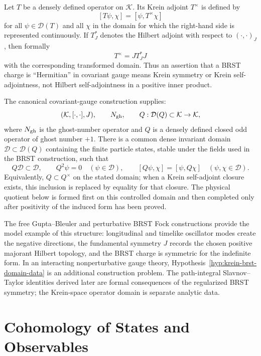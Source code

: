 Let \(T\) be a densely defined operator on \(\mathcal K\).  Its Krein adjoint
\(T^\times\) is defined by
\[
  [T\psi,\chi]=[\psi,T^\times\chi]
\]
for all \(\psi\in\mathcal D(T)\) and all \(\chi\) in the domain for which the
right-hand side is represented continuously.  If \(T_J^*\) denotes the Hilbert
adjoint with respect to \((\cdot,\cdot)_J\), then formally
\[
  T^\times=J T_J^* J
\]
with the corresponding transformed domain.  Thus an assertion that a BRST
charge is ``Hermitian'' in covariant gauge means Krein symmetry or
Krein self-adjointness, not Hilbert self-adjointness in a positive inner
product.

\begin{hypothesis}
\label{hyp:krein-brst-domain-data}
The canonical covariant-gauge construction supplies:
\[
  (\mathcal K,[\cdot,\cdot],J),\qquad
  N_{\rm gh},\qquad
  Q:\mathcal D(Q)\subset\mathcal K\to\mathcal K ,
\]
where \(N_{\rm gh}\) is the ghost-number operator and \(Q\) is a densely
defined closed odd operator of ghost number \(+1\).  There is a common dense
invariant domain \(\mathcal D\subset\mathcal D(Q)\) containing the finite
particle states, stable under the fields used in the BRST construction, such
that
\[
  Q\mathcal D\subset\mathcal D,\qquad
  Q^2\psi=0\quad(\psi\in\mathcal D),\qquad
  [Q\psi,\chi]=[\psi,Q\chi]\quad(\psi,\chi\in\mathcal D).
\]
Equivalently, \(Q\subset Q^\times\) on the stated domain; when a Krein
self-adjoint closure exists, this inclusion is replaced by equality for that
closure.  The physical quotient below is formed first on this controlled
domain and then completed only after positivity of the induced form has been
proved.
\end{hypothesis}

The free Gupta--Bleuler and perturbative BRST Fock constructions provide the
model example of this structure: longitudinal and timelike oscillator modes
create the negative directions, the fundamental symmetry \(J\) records the
chosen positive majorant Hilbert topology, and the BRST charge is symmetric
for the indefinite form.  In an interacting nonperturbative gauge theory,
Hypothesis~\ref{hyp:krein-brst-domain-data} is an additional construction
problem.  The path-integral Slavnov--Taylor identities derived later are
formal consequences of the regularized BRST symmetry; the Krein-space
operator domain is separate analytic data.

\section{Cohomology of States and Observables}

